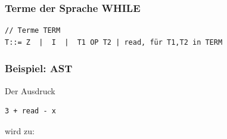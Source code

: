 \subsubsection{Terme der Sprache WHILE}
\begin{lstlisting}
// Terme TERM
T::= Z  |  I  |  T1 OP T2 | read, für T1,T2 in TERM
\end{lstlisting}

\subsubsection{Beispiel: AST}
Der Ausdruck
\begin{lstlisting}
3 + read - x 
\end{lstlisting}
wird zu:\\

